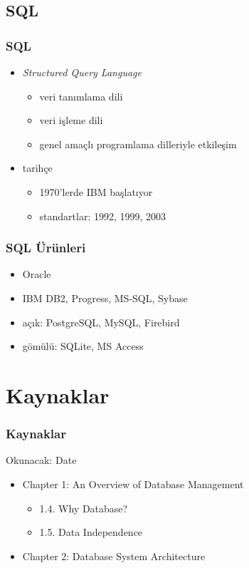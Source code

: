 \documentclass[dvipsnames]{beamer}
\theoremstyle{definition}
\theoremstyle{example}
\theoremstyle{plain}
\begin{document}
\subsection{SQL}

\begin{frame}
  \frametitle{SQL}

  \begin{itemize}
    \item \emph{Structured Query Language}
    \begin{itemize}
      \item veri tanımlama dili
      \item veri işleme dili
      \item genel amaçlı programlama dilleriyle etkileşim
    \end{itemize}

    \pause
    \bigskip
    \item tarihçe
    \begin{itemize}
      \item 1970'lerde IBM başlatıyor
      \item standartlar: 1992, 1999, 2003
    \end{itemize}
  \end{itemize}
\end{frame}

\begin{frame}
  \frametitle{SQL Ürünleri}

  \begin{itemize}
    \item Oracle
    \item IBM DB2, Progress, MS-SQL, Sybase
    \item açık: PostgreSQL, MySQL, Firebird
    \item gömülü: SQLite, MS Access
  \end{itemize}
\end{frame}

\section*{Kaynaklar}

\begin{frame}
  \frametitle{Kaynaklar}

  \begin{block}{Okunacak: Date}
    \begin{itemize}
      \item Chapter 1: An Overview of Database Management
      \begin{itemize}
        \item 1.4. \alert{Why Database?}
        \item 1.5. \alert{Data Independence}
      \end{itemize}

      \item Chapter 2: \alert{Database System Architecture}
    \end{itemize}
  \end{block}
\end{frame}
\end{document}
